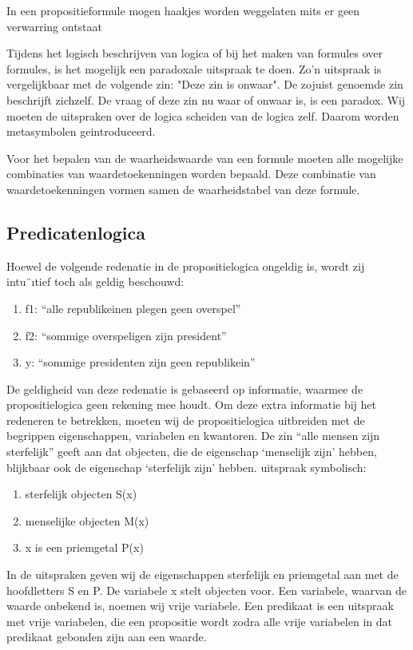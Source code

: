 \documentclass{article}
\begin{document}
	In een propositieformule mogen haakjes worden weggelaten mits er geen verwarring ontstaat
	
	Tijdens het logisch beschrijven van logica of bij het maken van formules over formules, is
	het mogelijk  een paradoxale uitspraak te doen. Zo’n uitspraak is vergelijkbaar met
	de volgende zin: "Deze zin is onwaar".
	De zojuist genoemde zin beschrijft zichzelf. De vraag of deze zin nu waar of onwaar is, is een paradox.
	Wij moeten de uitspraken over de logica scheiden van de logica zelf. Daarom worden
	metasymbolen geintroduceerd.  
	
	Voor het bepalen van de waarheidswaarde van een formule    moeten alle
	mogelijke combinaties van waardetoekenningen worden bepaald. Deze combinatie van
	waardetoekenningen vormen samen de waarheidstabel van deze formule.
	
	
	\subsection{Predicatenlogica}
	
	Hoewel de volgende redenatie in de propositielogica ongeldig is, wordt zij intu¨ıtief toch
	als geldig beschouwd:
	\begin{enumerate}
		\item f1: “alle republikeinen plegen geen overspel”
		\item f2: “sommige overspeligen zijn president”
		\item y: “sommige presidenten zijn geen republikein”
	\end{enumerate}
	De geldigheid van deze redenatie is gebaseerd op informatie, waarmee de propositielogica
	geen rekening mee houdt. Om deze extra informatie bij het redeneren te betrekken,
	moeten wij de propositielogica uitbreiden met de begrippen eigenschappen, variabelen en
	kwantoren. De zin “alle mensen zijn sterfelijk” geeft aan dat objecten, die de eigenschap
	‘menselijk zijn’ hebben, blijkbaar ook de eigenschap ‘sterfelijk zijn’ hebben.
	uitspraak symbolisch:
	
	\begin{enumerate}
		\item sterfelijk objecten S(x)
		\item menselijke objecten M(x)
		\item x is een priemgetal P(x)
	\end{enumerate}
	
	
	In de uitspraken geven wij de eigenschappen sterfelijk en priemgetal aan met de hoofdletters
	S en P. De variabele x stelt objecten voor. Een variabele, waarvan de waarde onbekend
	is, noemen wij vrije variabele. Een predikaat is een uitspraak met vrije variabelen, die een
	propositie wordt zodra alle vrije variabelen in dat predikaat gebonden zijn aan een waarde.
	
\end{document}
